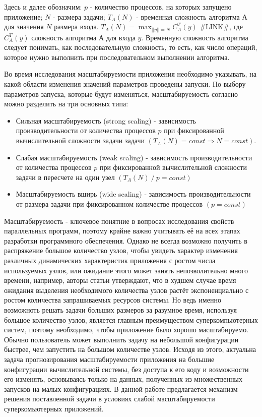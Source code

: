 	Здесь и далее обозначим: \(p\) - количество процессов, на которых запущено приложение; \(N\) - размера задачи; \(T_A(N)\) - временная сложность алгоритма \(А\) для значения \(N\) размера входа. \(T_A(N) = \max_{||y|| = N}C^T_A(y)\) \#LINK\#, где \(C^T_A(y)\) сложность %
	алгоритма \(А\) для входа \(y\). Временную сложность алгоритма следует понимать, как последовательную сложность, то есть, как число операций, которое нужно выполнить при последовательном выполнении алгоритма.

	Во время исследования масштабируемости приложения необходимо указывать, на какой области изменения значений параметров проведены запуски. По выбору параметров запуска, которые будут изменяться, масштабируемость согласно \cite{scaling_types} можно разделить на три основных типа:
	\begin{itemize}
		\item Сильная масштабируемость (strong scaling) - зависимость производительности от количества процессов \(p\) при фиксированной вычислительной сложности задачи задачи \((T_A(N) = const \Rightarrow N = const)\).
		\item Слабая масштабируемость (weak scaling) - зависимость производительности от количества процессов \(p\) при фиксированной вычислительной сложности задачи в пересчете на один узел \((T_A(N)\:/\:p = const)\)
		\item Масштабируемость вширь (wide scaling) - зависимость производительности от размера задачи при фиксированном количестве процессов \((p = const)\)
	\end{itemize}


	Масштабируемость - ключевое понятние в вопросах исследования свойств параллельных программ, поэтому крайне важно учитывать её на всех этапах разработки программного обеспечения. Однако не всегда возможно получить в распряжение большое количество узлов, чтобы увидеть характер изменения различных динамических характеристик приложения с ростом числа используемых узлов, или ожидание этого может занять непозволительно много времени, например, авторы статьи \cite{log_main} утверждают, что в худшем случае время ожидания выделения необходимого количества узлов растёт экспоненциально с ростом количества запрашиваемых ресурсов системы. Но ведь именно возможноть решать задачи больших размеров за разумное время, используя большое количество узлов, является главным преимуществом суперкомпьютерных систем, поэтому необходимо, чтобы приложение было хорошо масштабируемо. Обычно пользователь может выполнить задачу на небольшой конфигурации быстрее, чем запустить на большом количестве узлов. Исходя из этого, актуальна задача прогнозирования масштабируемости приложения на большие конфигурации вычислительной системы, без доступа к его коду и возможности его изменять, основываясь только на данных, полученных из множественных запусков на малых конфигурациях. В данной работе предлагается механизм решения поставленной задачи в условиях слабой масштабируемости суперкомьютерных приложений.

